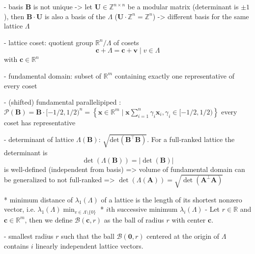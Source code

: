 \documentclass[
  a4paper,  %
  twoside,  %
  bibliography=totoc,
  headsepline,
  cleardoublepage=empty,
  parskip=half,
  draft=false
]{scrbook}
\begin{document}
    - basis $\mathbf{B}$ is not unique -> let $\mathbf{U}\in \mathbb{Z}^{n\times n}$ be a modular matrix (determinant is $\pm1$), then $\mathbf{B}\cdot \mathbf{U}$ is also a basis of the $\Lambda$ ($\mathbf{U} \cdot \mathbb{Z}^{n} = \mathbb{Z}^{n}$) -> different basis for the same lattice $\Lambda$

    - lattice coset:
      quotient group $\mathbb{R}^n/\Lambda$ of cosets
      \begin{equation*}
        \mathbf{c} + \Lambda = {\mathbf{c} + \mathbf{v} \mid v \in \Lambda}
      \end{equation*}
      with $\mathbf{c} \in \mathbb{R}^n$ %

    - fundamental domain: subset of $\mathbb{R}^m$ containing exactly one representative of every coset

    - (shifted) fundamental parallelipiped \label{eq:fundamental-parallelipiped}: $\mathcal{P}(\mathbf{B}) = \mathbf{B} \cdot [ - 1/2, 1/2)^n = \left\{ \mathbf{x} \in \mathbb{R}^m \mid \mathbf{x} \sum_{i=1}^n \gamma_i \mathbf{x}_i, \gamma_i \in  [ - 1/2, 1/2) \right\}$ every coset has representative  %

    - determinant of lattice $\Lambda(\mathbf{B})$: $\sqrt{\text{det}\left(\mathbf{B}^\intercal \mathbf{B}\right)}$. For a full-ranked lattice the determinant is 
    \begin{equation}
      \det(\Lambda(\mathbf{B})) = |\det(\mathbf{B})|
    \end{equation}
      is well-defined (independent from basis) => volume of fundamental domain %
      can be generalized to not full-ranked => $\det(\Lambda(\mathbf{A})) = \sqrt{\det(\mathbf{A}^\perp \mathbf{A})}$ %

  * minimum distance of $\lambda_1(\Lambda)$ of a lattice is the length of its shortest nonzero vector, i.e. $\lambda_1(\Lambda) \min_{v \in \Lambda \setminus \{0\}}$
  * $i$th successive minimum $\lambda_i(\Lambda)$
    - Let $r\in \mathbb{R}$ and $\mathbf{c} \in \mathbb{R}^m$, then we define $\mathcal{B}(\mathbf{c}, r)$ as the ball of radius $r$ with center $\mathbf{c}$. 

    - smallest radius $r$ such that the ball $\mathcal{B}(\mathbf{0}, r)$ centered at the origin of $\Lambda$ contains $i$ linearly independent lattice vectors. 
\end{document}
